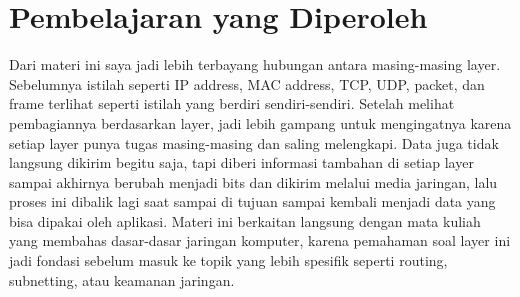 \documentclass[11pt]{article}
\begin{document}
\section*{Pembelajaran yang Diperoleh}

Dari materi ini saya jadi lebih terbayang hubungan antara masing-masing layer. Sebelumnya istilah seperti IP address, MAC address, TCP, UDP, packet, dan frame terlihat seperti istilah yang berdiri sendiri-sendiri. Setelah melihat pembagiannya berdasarkan layer, jadi lebih gampang untuk mengingatnya karena setiap layer punya tugas masing-masing dan saling melengkapi. Data juga tidak langsung dikirim begitu saja, tapi diberi informasi tambahan di setiap layer sampai akhirnya berubah menjadi bits dan dikirim melalui media jaringan, lalu proses ini dibalik lagi saat sampai di tujuan sampai kembali menjadi data yang bisa dipakai oleh aplikasi. Materi ini berkaitan langsung dengan mata kuliah yang membahas dasar-dasar jaringan komputer, karena pemahaman soal layer ini jadi fondasi sebelum masuk ke topik yang lebih spesifik seperti routing, subnetting, atau keamanan jaringan.
\end{document}
